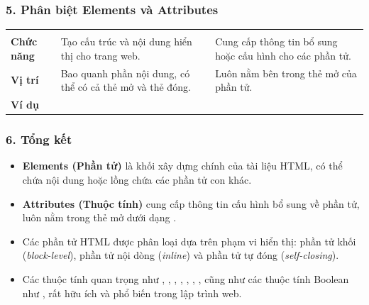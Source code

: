 \subsubsection{5. Phân biệt Elements và Attributes}

\begin{prettyTableBox}
\begin{tabularx}{\linewidth}{>{\bfseries\color{primaryBlue}}C{3.0cm} Z Z}
 &  &  \\
Chức năng & Tạo cấu trúc và nội dung hiển thị cho trang web. & Cung cấp thông tin bổ sung hoặc cấu hình cho các phần tử. \\
Vị trí & Bao quanh phần nội dung, có thể có cả thẻ mở và thẻ đóng. & Luôn nằm bên trong thẻ mở của phần tử. \\
Ví dụ &  &  \\
\end{tabularx}
\end{prettyTableBox}

\subsubsection{6. Tổng kết}

\begin{noteBox}
\begin{itemize}[leftmargin=1.8em, itemsep=3pt, parsep=0pt]
    \item \textbf{Elements (Phần tử)} là khối xây dựng chính của tài liệu HTML, có thể chứa nội dung hoặc lồng chứa các phần tử con khác.
    \item \textbf{Attributes (Thuộc tính)} cung cấp thông tin cấu hình bổ sung về phần tử, luôn nằm trong thẻ mở dưới dạng .
    \item Các phần tử HTML được phân loại dựa trên phạm vi hiển thị: phần tử khối (\textit{block-level}), phần tử nội dòng (\textit{inline}) và phần tử tự đóng (\textit{self-closing}).
    \item Các thuộc tính quan trọng như , , , , , , , cũng như các thuộc tính Boolean như ,  rất hữu ích và phổ biến trong lập trình web.
\end{itemize}
\end{noteBox}


